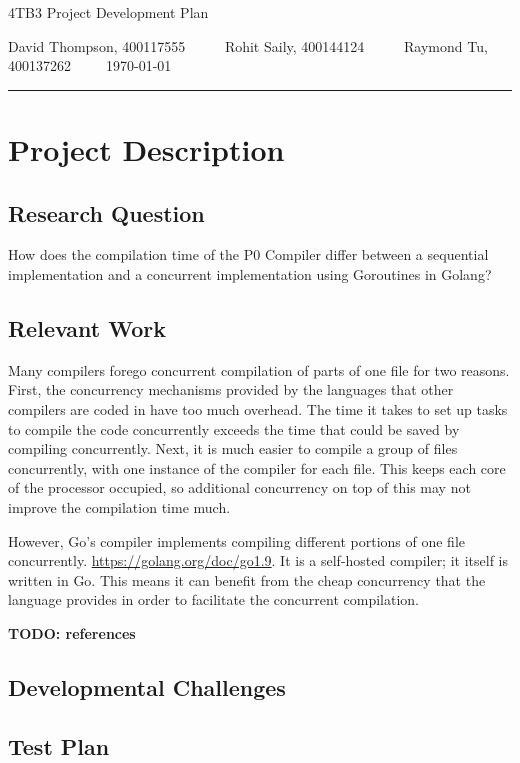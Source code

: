 \documentclass{article}
\author{Rohit Saily, David Thompson, Raymond Tu}
\date{\today}
\title{\mytitle}
\newcommand{\mytitle}{4TB3 Project Development Plan}
\begin{document}
{\sffamily
{\huge \mytitle}

\medskip

David Thompson, 400117555~~~~~
Rohit Saily, 400144124~~~~~
Raymond Tu, 400137262~~~~~\today
}

\par\noindent\rule{\textwidth}{0.4pt}
\bigskip

\section{Project Description}

\subsection{Research Question}

How does the compilation time of the P0 Compiler differ between a sequential implementation and a concurrent implementation using Goroutines in Golang?  

\subsection{Relevant Work}

Many compilers forego concurrent compilation of parts of one file for two
reasons.
First, the concurrency mechanisms provided by the languages that other compilers
are coded in have too much overhead.
The time it takes to set up tasks to compile the code concurrently exceeds the
time that could be saved by compiling concurrently.
Next, it is much easier to compile a group of files concurrently, with one
instance of the compiler for each file.
This keeps each core of the processor occupied, so additional concurrency on top
of this may not improve the compilation time much.

However, Go's compiler implements compiling different portions of one file
concurrently.
\url{https://golang.org/doc/go1.9}.
It is a self-hosted compiler; it itself is written in Go.
This means it can benefit from the cheap concurrency that the language provides
in order to facilitate the concurrent compilation.

\textbf{TODO: references}

\subsection{Developmental Challenges} %

\subsection{Test Plan} %
\end{document}
